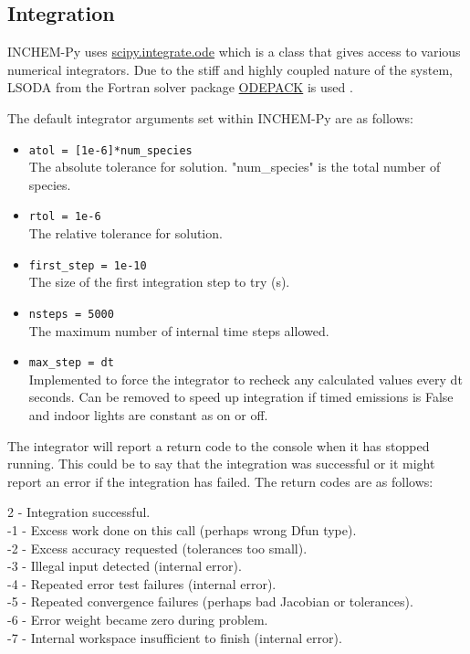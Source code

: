 \documentclass[a4paper]{refart}
\begin{document}
\subsection{Integration}\label{Integration}
INCHEM-Py uses \hyperlink{https://docs.scipy.org/doc/scipy/reference/generated/scipy.integrate.ode.html}{scipy.integrate.ode} which is a class that gives access to various numerical integrators. Due to the stiff and highly coupled nature of the system, LSODA from the Fortran solver package \hyperlink{http://www.netlib.org/odepack/}{ODEPACK} is used \cite{Hindmarsh1983}.

The default integrator arguments set within INCHEM-Py are as follows:
\begin{itemize}
    \item \texttt{atol = [1e-6]*num\_species}\\
    The absolute tolerance for solution. "num\_species" is the total number of species.
    \item \texttt{rtol = 1e-6}\\
    The relative tolerance for solution.
    \item \texttt{first\_step = 1e-10}\\
    The size of the first integration step to try (s).
    \item \texttt{nsteps = 5000}\\
    The maximum number of internal time steps allowed.
    \item \texttt{max\_step = dt}\\
    Implemented to force the integrator to recheck any calculated values every dt seconds. Can be removed to speed up integration if timed emissions is False and indoor lights are constant as on or off.
\end{itemize}


The integrator will report a return code to the console when it has stopped running. This could be to say that the integration was successful or it might report an error if the integration has failed. The return codes are as follows:

2 - Integration successful.\\
-1 - Excess work done on this call (perhaps wrong Dfun type).\\
-2 - Excess accuracy requested (tolerances too small).\\
-3 - Illegal input detected (internal error).\\
-4 - Repeated error test failures (internal error).\\
-5 - Repeated convergence failures (perhaps bad Jacobian or tolerances).\\
-6 - Error weight became zero during problem.\\
-7 - Internal workspace insufficient to finish (internal error).
\end{document}
